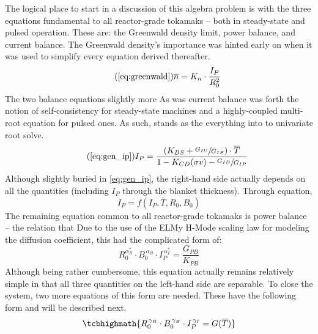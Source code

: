 The logical place to start in a discussion of this algebra problem is with the three equations fundamental to all reactor-grade tokamaks -- both in steady-state and pulsed operation. These are: the Greenwald density limit, power balance, and current balance. The Greenwald density's importance was hinted early on when it was used to simplify every equation derived thereafter.
\begin{equation}
	\tag{\ref{eq:greenwald}}
	\overline n = K_n \cdot \frac{I_P}{R_0^2}
\end{equation}
The two balance equations  slightly more  As was  current balance  was  forth the notion of self-consistency for steady-state machines and a highly-coupled multi-root equation for pulsed ones. As such,  stands as the  everything  into to  univariate root solve.
\begin{equation}
	\tag{\ref{eq:gen_ip}}
	I_P = \frac{ \left( K_{BS} + \sfrac{ G_{IU} }{ G_{IP} } \right) \cdot \overline T }{ 1 - K_{CD} ( \sigma v ) - \sfrac{ G_{ID} }{ G_{IP} } }
\end{equation}
Although slightly buried in \cref{eq:gen_ip}, the right-hand side actually depends on all the quantities (including $I_P$ through the  blanket thickness). Through equation,
\begin{equation}
	I_P = f(I_P, \overline T, R_0, B_0)
\end{equation}
The remaining equation common to all reactor-grade tokamaks is power balance -- the relation that  Due to the use of the ELMy H-Mode scaling law for modeling the diffusion coefficient, this had the complicated form of:
\begin{equation}
	\label{eq:freidberg}
	R_0^{ \alpha_R^* } \cdot B_0^{\,\alpha_B} \cdot I_P^{\,\alpha_I^*} = \frac{ G_{PB} }{ K_{PB} }
\end{equation}
Although being rather cumbersome, this equation actually remains relatively simple in that all three quantities on the left-hand side are separable. To close the system, two more equations of this form are needed. These have the following form and will be described next.
\begin{equation}
	\label{eq:rbi}
	\tcbhighmath{
	R_0^{\, \gamma_R} \cdot B_0^{\, \gamma_B} \cdot I_P^{\, \gamma_I} = G( \overline T )
	}
\end{equation}

